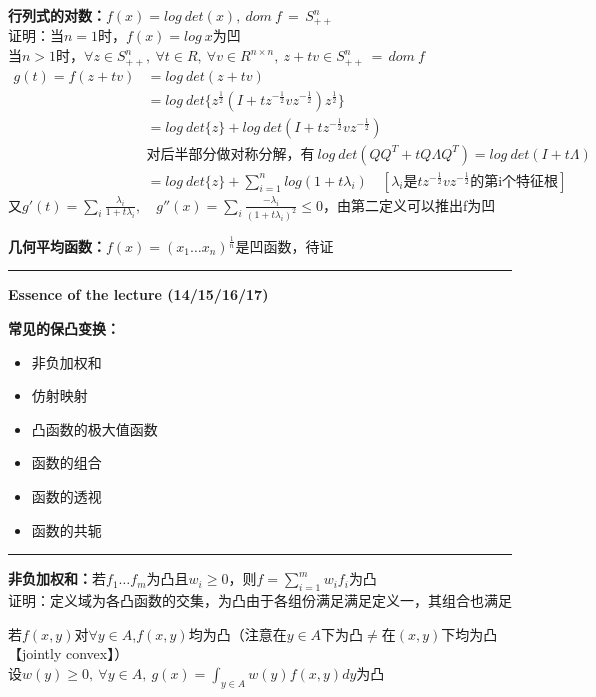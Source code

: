 \documentclass[11pt]{ctexart}         %
\begin{document}
\textbf{行列式的对数：}$f(x)=log\ det(x),\ dom\ f\,=\,S_{++}^n$\\
证明：当$n=1$时，$f(x)=log\ x$为凹\\
\phantom{证明：}当$n>1$时，$\forall z\in S_{++}^n,\ \forall t\in R,\ \forall v\in R^{n\times n},\ z+tv\in S_{++}^n\,=\,dom\ f$
\begin{align*}
	g(t)=f(z+tv)&=log\ det(z+tv)\\
	&=log\ det\{z^{\frac{1}{2}}(I+tz^{-\frac{1}{2}}vz^{-\frac{1}{2}})z^{\frac{1}{2}}\}\\
	&=log\ det\{z\}+log\ det(I+tz^{-\frac{1}{2}}vz^{-\frac{1}{2}})\\
	&\text{对后半部分做对称分解，有}\ log\ det(QQ^T+tQ\Lambda Q^T)=log\ det(I+t\Lambda)\\
	&=log\ det\{z\}+\sum_{i=1}^{n}log(1+t\lambda_i)\quad[\lambda_i\text{是}tz^{-\frac{1}{2}}vz^{-\frac{1}{2}}\text{的第i个特征根}]
\end{align*}
\phantom{证明：}又$g'(t)=\sum_{i}\frac{\lambda_i}{1+t\lambda_i},\quad g''(x)=\sum_{i}\frac{-\lambda_i}{(1+t\lambda_i)^2}\leq 0$，由第二定义可以推出f为凹

\textbf{几何平均函数：}$f(x)=(x_1\dots x_n)^{\frac{1}{n}}$是凹函数，待证

\newpage
\hrule height 4pt
\begin{Large}
	\textbf{Essence of the lecture (14/15/16/17)}\\
\end{Large}
\begin{large}
	\textbf{常见的保凸变换：} 
\end{large}
\vspace{-16pt}
\begin{itemize} \setlength{\itemsep}{0pt}
	\item 非负加权和
	\item 仿射映射
	\item 凸函数的极大值函数
	\item 函数的组合
	\item 函数的透视
	\item 函数的共轭
\end{itemize}
\hrule height 4pt

\textbf{非负加权和：}若$f_1\dots f_m$为凸且$w_i\geq 0$，则$f=\sum_{i=1}^{m}w_if_i$为凸\\
证明：定义域为各凸函数的交集，为凸\quad {}由于各组份满足满足定义一，其组合也满足

若$f(x,y)$对$\forall y\in A$,$f(x,y)$均为凸（注意在$y\in A$下为凸$\neq$在$(x,y)$下均为凸【jointly convex】）\\
设$w(y)\geq 0,\ \forall y\in A,\ g(x)=\int_{y\in A}w(y)f(x,y)dy$为凸
\end{document}
